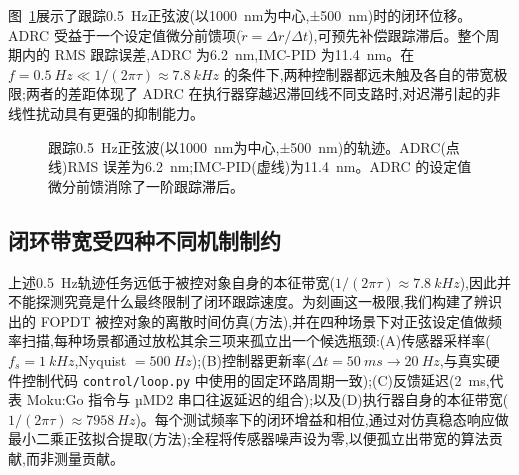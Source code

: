 \documentclass[fleqn,10pt]{wlscirep}
\begin{document}
图~\ref{fig:traj}展示了跟踪\SI{0.5}{Hz}正弦波(以\SI{1000}{nm}为中心,±\SI{500}{nm})时的闭环位移。ADRC 受益于一个设定值微分前馈项($\dot{r} = \Delta r / \Delta t$),可预先补偿跟踪滞后。整个周期内的 RMS 跟踪误差,ADRC 为\SI{6.2}{nm},IMC-PID 为\SI{11.4}{nm}。在 $f = \SI{0.5}{Hz} \ll 1/(2\pi\tau) \approx \SI{7.8}{kHz}$ 的条件下,两种控制器都远未触及各自的带宽极限;两者的差距体现了 ADRC 在执行器穿越迟滞回线不同支路时,对迟滞引起的非线性扰动具有更强的抑制能力。

\begin{figure}[ht]
    \centering
    \caption{跟踪\SI{0.5}{Hz}正弦波(以\SI{1000}{nm}为中心,±\SI{500}{nm})的轨迹。ADRC(点线)RMS 误差为\SI{6.2}{nm};IMC-PID(虚线)为\SI{11.4}{nm}。ADRC 的设定值微分前馈消除了一阶跟踪滞后。}
    \label{fig:traj}
\end{figure}

\subsection*{闭环带宽受四种不同机制制约}

上述\SI{0.5}{Hz}轨迹任务远低于被控对象自身的本征带宽($1/(2\pi\tau) \approx \SI{7.8}{kHz}$),因此并不能探测究竟是什么最终限制了闭环跟踪速度。为刻画这一极限,我们构建了辨识出的 FOPDT 被控对象的离散时间仿真(方法),并在四种场景下对正弦设定值做频率扫描,每种场景都通过放松其余三项来孤立出一个候选瓶颈:(A)传感器采样率($f_s = \SI{1}{kHz}$,Nyquist $= \SI{500}{Hz}$);(B)控制器更新率($\Delta t = \SI{50}{ms} \rightarrow \SI{20}{Hz}$,与真实硬件控制代码 \texttt{control/loop.py} 中使用的固定环路周期一致);(C)反馈延迟(\SI{2}{ms},代表 Moku:Go 指令与 µMD2 串口往返延迟的组合);以及(D)执行器自身的本征带宽($1/(2\pi\tau) \approx \SI{7958}{Hz}$)。每个测试频率下的闭环增益和相位,通过对仿真稳态响应做最小二乘正弦拟合提取(方法);全程将传感器噪声设为零,以便孤立出带宽的算法贡献,而非测量贡献。
\end{document}
